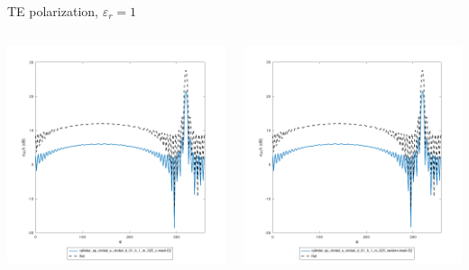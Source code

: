 \begin{frame}{TE polarization, $\varepsilon_r=1$}
\begin{columns}

\includegraphics[width=\linewidth]{results/FF/cylD_01_H_1_M_025_Z/epr1_TE.png}


\includegraphics[width=\linewidth]{results/FF/cylD_01_H_1_M_025_RANDOM/epr1_TE.png}


\end{columns}
\end{frame}
